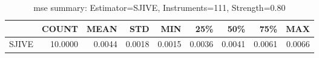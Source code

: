 \begin{table}[ht]
\centering
\caption{mse summary: Estimator=SJIVE, Instruments=111, Strength=0.80}
\begin{tabular}{lrrrrrrrr}
\toprule
 & COUNT & MEAN & STD & MIN & 25\% & 50\% & 75\% & MAX \\
\midrule
SJIVE & 10.0000 & 0.0044 & 0.0018 & 0.0015 & 0.0036 & 0.0041 & 0.0061 & 0.0066 \\
\bottomrule
\end{tabular}
\end{table}
